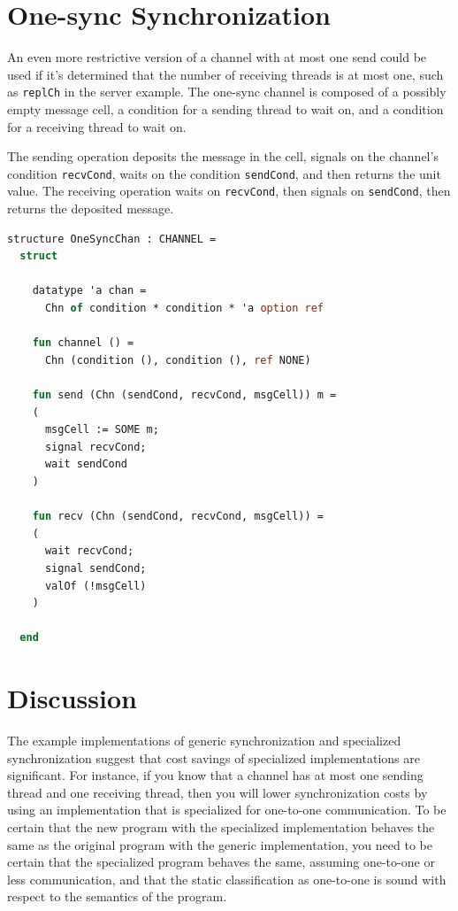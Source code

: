 \documentclass[letterpaper, 11pt]{report}
\begin{document}
\section{One-sync Synchronization}

An even more restrictive version of a channel with at most one send could be used if it's
determined that the number of receiving threads is at most one,
such as \lstinline{replCh} in the server example.
The one-sync channel is
composed of a possibly empty message cell, a condition for a sending thread to wait on,
and a condition for a receiving thread to wait on.

The sending operation deposits the message in the cell, signals on the channel's condition \lstinline{recvCond},
waits on the condition \lstinline{sendCond}, and then returns the unit value.
The receiving operation waits on \lstinline{recvCond},
then signals on \lstinline{sendCond}, then returns the deposited message.

\begin{lstlisting}[language=ML, mathescape]
  structure OneSyncChan : CHANNEL =
  struct

    datatype 'a chan =
      Chn of condition * condition * 'a option ref

    fun channel () =
      Chn (condition (), condition (), ref NONE)

    fun send (Chn (sendCond, recvCond, msgCell)) m =
    (
      msgCell := SOME m;
      signal recvCond;  
      wait sendCond
    )

    fun recv (Chn (sendCond, recvCond, msgCell)) =
    (
      wait recvCond;
      signal sendCond;
      valOf (!msgCell)
    )

  end
\end{lstlisting}

\section{Discussion}
The example implementations of generic synchronization and specialized synchronization suggest
that cost savings of specialized implementations are significant. For instance, if you know that
a channel has at most one sending thread and one receiving thread, then you will
lower synchronization costs by
using an implementation that is specialized for one-to-one communication. To be certain that
the new program with the specialized implementation behaves the same as the original program
with the generic implementation, you need to be certain that the
specialized program behaves the same, assuming one-to-one or less communication, and that
the static classification as one-to-one is sound with respect to the semantics of the program. 
\end{document}
